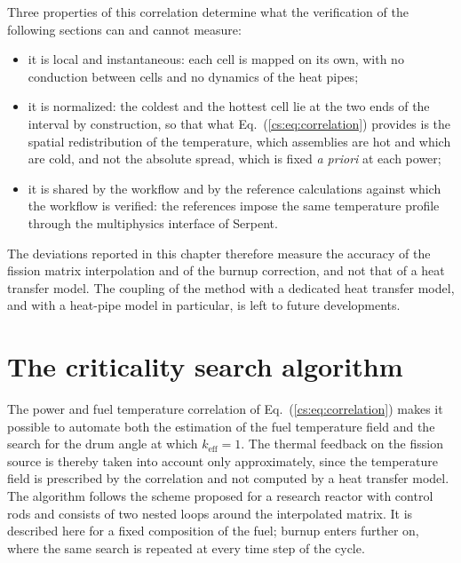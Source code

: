 Three properties of this correlation determine what the verification of the
following sections can and cannot measure:
\begin{itemize}
  \item it is local and instantaneous: each cell is mapped on its own, with no
  conduction between cells and no dynamics of the heat pipes;
  \item it is normalized: the coldest and the hottest cell lie at the two ends of
  the interval by construction, so that what Eq.~(\ref{cs:eq:correlation})
  provides is the spatial redistribution of the temperature, which assemblies
  are hot and which are cold, and not the absolute spread, which is fixed
  \emph{a priori} at each power;
  \item it is shared by the workflow and by the reference calculations against
  which the workflow is verified: the references impose the same temperature
  profile through the multiphysics interface of Serpent.
\end{itemize}
The deviations reported in this chapter
therefore measure the accuracy of the fission matrix interpolation and of the
burnup correction, and not that of a heat transfer model. The coupling of the method
with a dedicated heat transfer model, and with a heat-pipe model in particular, is
left to future developments.

\section{The criticality search algorithm}\label{cs:sec:algorithm}

The power and fuel temperature correlation of Eq.~(\ref{cs:eq:correlation})
makes it possible to automate both the estimation of the fuel temperature
field and the search for the drum angle at which $k_{\mathrm{eff}}=1$. The
thermal feedback on the fission source is thereby taken into account only
approximately, since the temperature field is prescribed by the correlation
and not computed by a heat transfer model. The algorithm follows the scheme
proposed for a research reactor with control rods \cite{Topham2020} and
consists of two nested loops around the interpolated matrix. It is described
here for a fixed composition of the fuel; burnup enters further on, where the
same search is repeated at every time step of the cycle.


